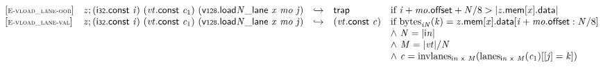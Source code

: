 \vspace{1ex}

$$
\begin{array}{@{}l@{}lcl@{}l@{}}
{[\textsc{\scriptsize E{-}vload\_lane{-}oob}]} \quad & {\mathit{z}} ; (\mathsf{i{\scriptstyle32}}.\mathsf{const}~{\mathit{i}})~({\mathit{vt}}.\mathsf{const}~{\mathit{c}}_{{1}})~({{{\mathsf{v{\scriptstyle128}.load}}{{\mathit{N}}}}{\mathsf{\_}}}{\mathsf{lane}}~{\mathit{x}}~{\mathit{mo}}~{\mathit{j}}) &\hookrightarrow& \mathsf{trap} &\quad
  \mbox{if}~{\mathit{i}} + {\mathit{mo}}.\mathsf{offset} + {\mathit{N}} / 8 > {|{{\mathit{z}}.\mathsf{mem}}{{}[{\mathit{x}}]}.\mathsf{data}|} \\
{[\textsc{\scriptsize E{-}vload\_lane{-}val}]} \quad & {\mathit{z}} ; (\mathsf{i{\scriptstyle32}}.\mathsf{const}~{\mathit{i}})~({\mathit{vt}}.\mathsf{const}~{\mathit{c}}_{{1}})~({{{\mathsf{v{\scriptstyle128}.load}}{{\mathit{N}}}}{\mathsf{\_}}}{\mathsf{lane}}~{\mathit{x}}~{\mathit{mo}}~{\mathit{j}}) &\hookrightarrow& ({\mathit{vt}}.\mathsf{const}~{\mathit{c}}) &\quad
  \mbox{if}~{{\mathrm{bytes}}}_{{{\mathit{i}}}{{\mathit{N}}}}({\mathit{k}}) = {{\mathit{z}}.\mathsf{mem}}{{}[{\mathit{x}}]}.\mathsf{data}{}[{\mathit{i}} + {\mathit{mo}}.\mathsf{offset} : {\mathit{N}} / 8] \\
 &&&&\quad {\land}~{\mathit{N}} = {|{\mathsf{i}}{{\mathit{n}}}|} \\
 &&&&\quad {\land}~{\mathit{M}} = {|{\mathit{vt}}|} / {\mathit{N}} \\
 &&&&\quad {\land}~{\mathit{c}} = {{\mathrm{invlanes}}}_{{\mathsf{i}}{{\mathit{n}}}~\mathsf{x}~{\mathit{M}}}({{\mathrm{lanes}}}_{{\mathsf{i}}{{\mathit{n}}}~\mathsf{x}~{\mathit{M}}}({\mathit{c}}_{{1}}){}[{}[{\mathit{j}}] = {\mathit{k}}]) \\
\end{array}
$$

\vspace{1ex}


